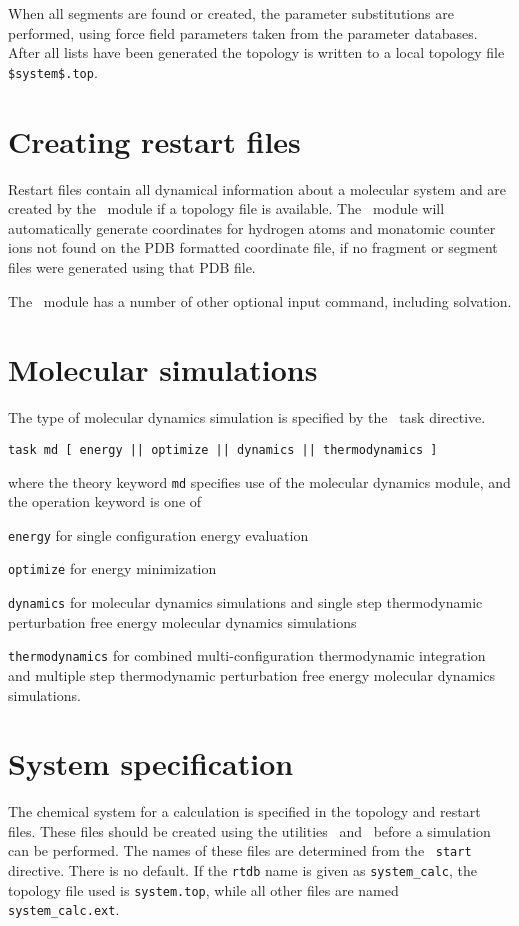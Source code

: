 When all segments are found or created, the parameter substitutions are 
performed, using force field parameters taken from the parameter 
databases. After all lists have been generated the
topology is written to a local topology file \verb+$system$.top+.

\section{Creating restart files}
\label{sec:nwanwrst}

Restart files contain all dynamical information about a molecular
system and are created by the \prepare\ module if a topology file
is available. The \prepare\ module will automatically generate
coordinates for hydrogen atoms and monatomic counter ions
not found on the PDB formatted coordinate file, if no fragment or
segment files were generated using that PDB file.

The \prepare\ module has a number of other optional input command,
including solvation.

\section{Molecular simulations}
The type of molecular dynamics simulation is specified by the
\nwchem\ task directive.
\begin{verbatim}
task md [ energy || optimize || dynamics || thermodynamics ]
\end{verbatim}
where the theory keyword {\tt md} specifies use of the molecular
dynamics module, and the operation keyword is one of
\begin{description}
\item
{\tt energy} for single configuration energy evaluation
\item
{\tt optimize} for energy minimization
\item
{\tt dynamics} for molecular dynamics simulations and single step
thermodynamic perturbation free energy molecular dynamics simulations
\item
{\tt thermodynamics} for combined multi-configuration thermodynamic
integration and multiple step thermodynamic perturbation free
energy molecular dynamics simulations.
\end{description}

\section{System specification}
The chemical system for a calculation is specified in the topology
and restart files. These files should be created using the utilities
\nwtop\ and \nwrst\ before a simulation can be performed.
The names of these files are determined from the \nwchem\ \verb+start+ 
directive.
There is no default. If the \verb+rtdb+ name is given as {\tt system\_calc},
the topology file used is {\tt system.top}, while all other files
are named {\tt system\_calc.ext}.

